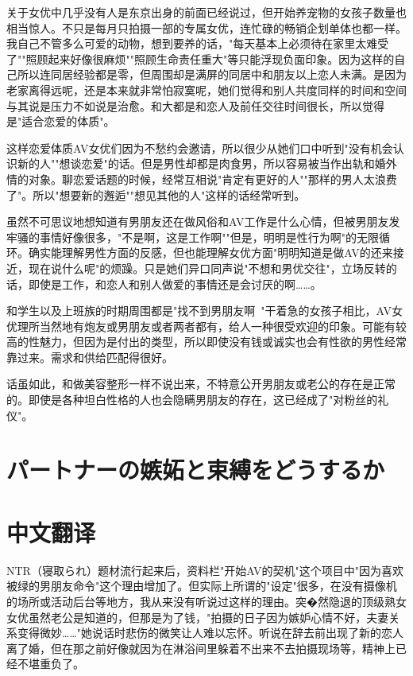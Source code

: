 \documentclass[12pt,UTF8]{ctexbook}
\begin{document}
关于女优中几乎没有人是东京出身的前面已经说过，但开始养宠物的女孩子数量也相当惊人。不只是每月只拍摄一部的专属女优，连忙碌的畅销企划单体也都一样。我自己不管多么可爱的动物，想到要养的话，"每天基本上必须待在家里太难受了""照顾起来好像很麻烦""照顾生命责任重大"等只能浮现负面印象。因为这样的自己所以连同居经验都是零，但周围却是满屏的同居中和朋友以上恋人未满。是因为老家离得远呢，还是本来就非常怕寂寞呢，她们觉得和别人共度同样的时间和空间与其说是压力不如说是治愈。和大都是和恋人及前任交往时间很长，所以觉得是"适合恋爱的体质"。

这样恋爱体质AV女优们因为不愁约会邀请，所以很少从她们口中听到"没有机会认识新的人""想谈恋爱"的话。但是男性却都是肉食男，所以容易被当作出轨和婚外情的对象。聊恋爱话题的时候，经常互相说"肯定有更好的人""那样的男人太浪费了"。所以"想要新的邂逅""想见其他的人"这样的话经常听到。

虽然不可思议地想知道有男朋友还在做风俗和AV工作是什么心情，但被男朋友发牢骚的事情好像很多，"不是啊，这是工作啊""但是，明明是性行为啊"的无限循环。确实能理解男性方面的反感，但也能理解女优方面"明明知道是做AV的还来接近，现在说什么呢"的烦躁。只是她们异口同声说"不想和男优交往"，立场反转的话，即使是工作，和恋人和别人做爱的事情还是会讨厌的啊……。

和学生以及上班族的时期周围都是"找不到男朋友啊~"干着急的女孩子相比，AV女优理所当然地有炮友或男朋友或者两者都有，给人一种很受欢迎的印象。可能有较高的性魅力，但因为是付出的类型，所以即使没有钱或诚实也会有性欲的男性经常靠过来。需求和供给匹配得很好。

话虽如此，和做美容整形一样不说出来，不特意公开男朋友或老公的存在是正常的。即使是各种坦白性格的人也会隐瞒男朋友的存在，这已经成了"对粉丝的礼仪"。

\switchcolumn

\section{パートナーの嫉妬と束縛をどうするか}

\switchcolumn

\section*{中文翻译}

NTR（寝取られ）题材流行起来后，资料栏"开始AV的契机"这个项目中"因为喜欢被绿的男朋友命令"这个理由增加了。但实际上所谓的"设定"很多，在没有摄像机的场所或活动后台等地方，我从来没有听说过这样的理由。突�然隐退的顶级熟女女优虽然老公是知道的，但那是为了钱，"拍摄的日子因为嫉妒心情不好，夫妻关系变得微妙……"她说话时悲伤的微笑让人难以忘怀。听说在辞去前出现了新的恋人离了婚，但在那之前好像就因为在淋浴间里躲着不出来不去拍摄现场等，精神上已经不堪重负了。
\end{document}
